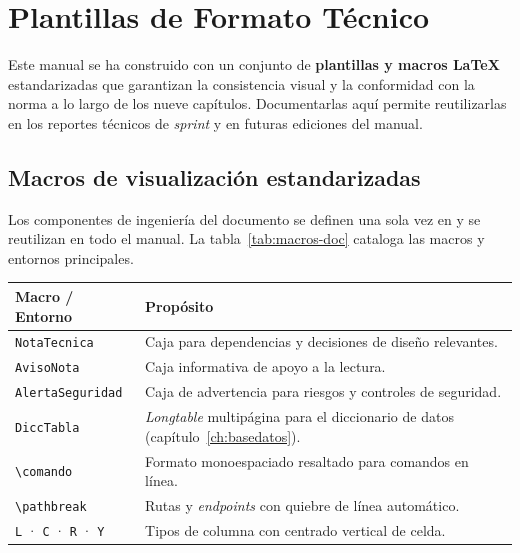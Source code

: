 \section{Plantillas de Formato Técnico}
\label{sec:plantillas}

Este manual se ha construido con un conjunto de \textbf{plantillas y macros LaTeX}
estandarizadas que garantizan la consistencia visual y la conformidad con la norma a lo
largo de los nueve capítulos. Documentarlas aquí permite reutilizarlas en los reportes
técnicos de \textit{sprint} y en futuras ediciones del manual.

\subsection{Macros de visualización estandarizadas}
\label{subsec:macros_doc}

Los componentes de ingeniería del documento se definen una sola vez en
 y se reutilizan en todo el manual. La
tabla~\ref{tab:macros-doc} cataloga las macros y entornos principales.

\vspace{0.2cm}
\noindent
\renewcommand{\arraystretch}{1.3}
\fontsize{8.5}{10.2}\selectfont\sffamily
\begin{tabularx}{\textwidth}{|L{3.6cm}|Y|}
\hline
{}
\sffamily\textbf{Macro / Entorno} & \sffamily\textbf{Propósito} \\
\hline
\texttt{NotaTecnica} & Caja para dependencias y decisiones de diseño relevantes. \\ \hline
{}
\texttt{AvisoNota} & Caja informativa de apoyo a la lectura. \\ \hline
\texttt{AlertaSeguridad} & Caja de advertencia para riesgos y controles de seguridad. \\ \hline
{}
\texttt{DiccTabla} & \textit{Longtable} multipágina para el diccionario de datos (capítulo~\ref{ch:basedatos}). \\ \hline
\texttt{\textbackslash comando} & Formato monoespaciado resaltado para comandos en línea. \\ \hline
{}
\texttt{\textbackslash pathbreak} & Rutas y \textit{endpoints} con quiebre de línea automático. \\ \hline
\texttt{L} · \texttt{C} · \texttt{R} · \texttt{Y} & Tipos de columna con centrado vertical de celda. \\ \hline
\end{tabularx}
\label{tab:macros-doc}

